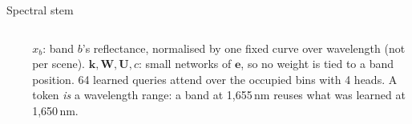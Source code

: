 \documentclass[aspectratio=169,10pt]{beamer}
\newcommand{\tx}[1]{{\fontsize{6.6}{7.9}\selectfont #1\par}}
\begin{document}
\begin{frame}{Spectral stem}
\begin{columns}[T,onlytextwidth]
{\begin{align*}
\end{align*}\par}
\vspace{-1.8mm}
\tx{$x_b$: band $b$'s reflectance, normalised by one fixed curve over wavelength (not per scene). $\mathbf k,\mathbf W,\mathbf U,c$: small networks of $\mathbf e$, so no weight is tied to a band position. 64 learned queries attend over the occupied bins with 4 heads. A token \emph{is} a wavelength range: a band at 1,655\,nm reuses what was learned at 1,650\,nm.}
\end{columns}
\end{frame}
\end{document}

